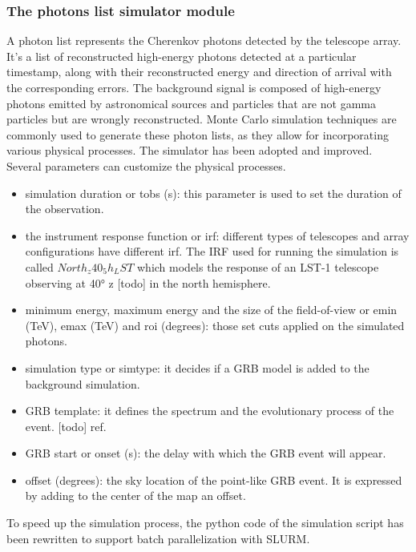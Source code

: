 \subsubsection{The photons list simulator module}
A photon list represents the Cherenkov photons detected by the telescope array. It's a list of reconstructed high-energy photons detected at a particular timestamp, along with their reconstructed energy and direction of arrival with the corresponding errors. The background signal is composed of high-energy photons emitted by astronomical sources and particles that are not gamma particles but are wrongly reconstructed. 
Monte Carlo simulation techniques are commonly used to generate these photon lists, as they allow for incorporating various physical processes. The simulator \cite{dipiano2022ctasagsci} has been adopted and improved. Several parameters can customize the physical processes. 

\begin{itemize}
    \item simulation duration or tobs (s): this parameter is used to set the duration of the observation. 
    \item the instrument response function or irf:  different types of telescopes and array configurations have different irf. The IRF used for running the simulation is called $North_z40_5h_LST$ which models the response of an LST-1 telescope observing at 40° z [todo] in the north hemisphere. 
    \item minimum energy, maximum energy and the size of the field-of-view or emin (TeV), emax (TeV) and roi (degrees): those set cuts applied on the simulated photons.
    \item simulation type or simtype: it decides if a GRB model is added to the background simulation.
    \item GRB template: it defines the spectrum and the evolutionary process of the event. [todo] ref. 
    \item GRB start or onset (s): the delay with which the GRB event will appear.
    \item offset (degrees): the sky location of the point-like GRB event. It is expressed by adding to the center of the map an offset.
\end{itemize}

To speed up the simulation process, the python code of the simulation script has been rewritten to support batch parallelization with SLURM. 

